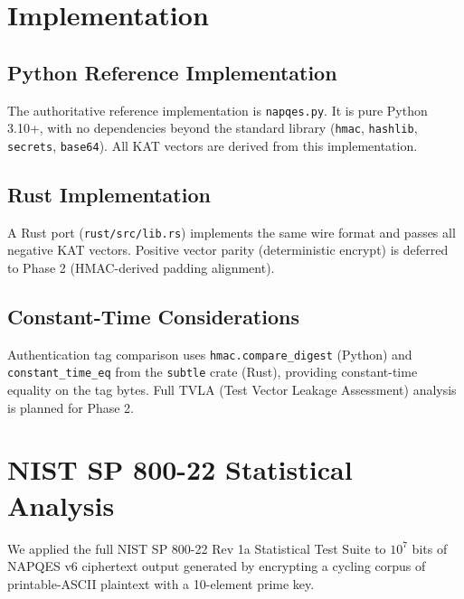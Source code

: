\documentclass[11pt,a4paper]{article}
\begin{document}
\section{Implementation}
\label{sec:implementation}

\subsection{Python Reference Implementation}

The authoritative reference implementation is \texttt{napqes.py}.  It is
pure Python 3.10+, with no dependencies beyond the standard library
(\texttt{hmac}, \texttt{hashlib}, \texttt{secrets}, \texttt{base64}).  All
KAT vectors are derived from this implementation.

\subsection{Rust Implementation}

A Rust port (\texttt{rust/src/lib.rs}) implements the same wire format and
passes all negative KAT vectors.  Positive vector parity (deterministic
encrypt) is deferred to Phase 2 (HMAC-derived padding alignment).

\subsection{Constant-Time Considerations}

Authentication tag comparison uses \texttt{hmac.compare\_digest} (Python) and
\texttt{constant\_time\_eq} from the \texttt{subtle} crate (Rust), providing
constant-time equality on the tag bytes.  Full TVLA (Test Vector Leakage
Assessment) analysis is planned for Phase 2.

\section{NIST SP 800-22 Statistical Analysis}
\label{sec:sts}

We applied the full NIST SP 800-22 Rev 1a Statistical Test Suite to
$10^7$ bits of NAPQES v6 ciphertext output generated by encrypting a
cycling corpus of printable-ASCII plaintext with a 10-element prime key.
\end{document}
